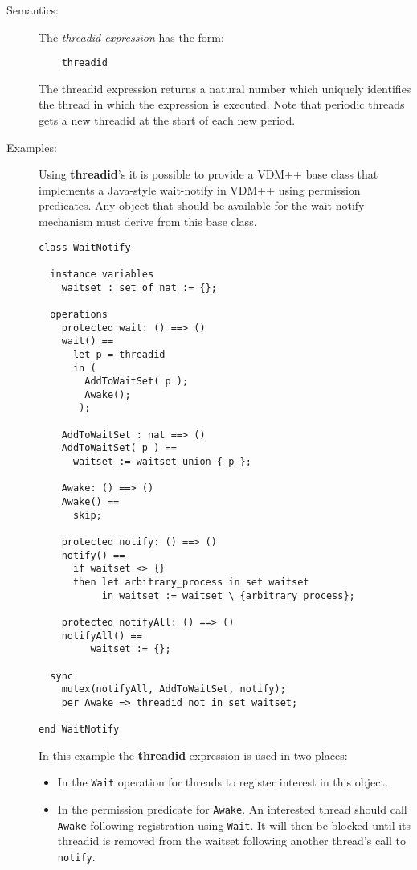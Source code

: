 \documentclass{overturerepchap}
\begin{document}
{\begin{description}
\item[Semantics:] The {\it threadid expression} has the form:

  \begin{lstlisting}
    threadid
  \end{lstlisting}
  The threadid expression returns a natural number which uniquely
  identifies the thread in which the expression is executed. Note that
  periodic threads gets a new threadid at the start of each new period.

\item[Examples:]
Using {\bf\ttfamily threadid}'s it is possible to provide a VDM++ base class that
implements a Java-style wait-notify in VDM++ using permission
predicates. Any object that should be available for the wait-notify
mechanism must derive from this base class.
\begin{lstlisting}
class WaitNotify

  instance variables
    waitset : set of nat := {};

  operations
    protected wait: () ==> ()
    wait() ==
      let p = threadid
      in (
        AddToWaitSet( p );
        Awake();
       );

    AddToWaitSet : nat ==> ()
    AddToWaitSet( p ) ==
      waitset := waitset union { p };

    Awake: () ==> ()
    Awake() ==
      skip;

    protected notify: () ==> ()
    notify() ==
      if waitset <> {}
      then let arbitrary_process in set waitset
           in waitset := waitset \ {arbitrary_process};

    protected notifyAll: () ==> ()
    notifyAll() ==
         waitset := {};

  sync
    mutex(notifyAll, AddToWaitSet, notify);
    per Awake => threadid not in set waitset;

end WaitNotify
\end{lstlisting}
In this example the {\bf\ttfamily threadid} expression is used in two places:
\begin{itemize}
\item In the \texttt{Wait} operation for threads to register interest
  in this object.
\item In the permission predicate for \texttt{Awake}. An interested
  thread should call \texttt{Awake} following registration using
  \texttt{Wait}. It will then be blocked until its threadid is removed
  from the waitset following another thread's call to \texttt{notify}.
\end{itemize}


\end{description}}
\end{document}
